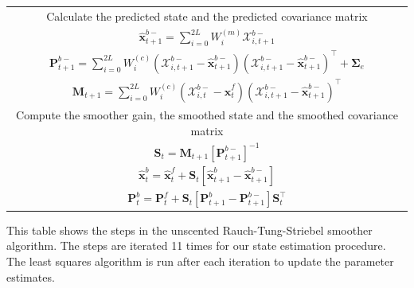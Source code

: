 \documentclass[12pt]{iopart}
\begin{document}
\begin{table}[!ht]
\begin{tabular}{|c|}
\multicolumn{1}{|p{16cm}|}{Calculate the predicted state and the predicted covariance matrix}\\
$\hat{\mathbf x}_{t+1}^{b-}=\sum_{i=0}^{2L} W_i^{(m)}\mathcal X_{i,t+1}^{b-}$\\
$\mathbf P_{t +1}^{b-}=\sum_{i=0}^{2L} W_i^{(c)}(\mathcal X_{i,t+1}^{b-}-\hat{\mathbf x}_{t +1}^{b-})(\mathcal X_{i,t+1}^{b-}-\hat{\mathbf x}_{t +1}^{b-})^\top+\boldsymbol \Sigma_e $\\
$\mathbf M_{t +1}=\sum_{i=0}^{2L} W_i^{(c)}(\mathcal X_{i,t}^{b-}-\hat{\mathbf x}_{t}^{f})(\mathcal X_{i,t+1}^{b-}-\hat{\mathbf x}_{t+1}^{b-})^\top$\\
\multicolumn{1}{|p{16cm}|}{Compute the smoother gain, the smoothed state and the smoothed covariance matrix}\\
$\mathbf S_t=\mathbf M_{t +1}\left[ \mathbf P_{t +1}^{b-}\right] ^{-1} $\\
$\hat{\mathbf x}_t^b=\hat{\mathbf x}_t^f+\mathbf S_t\left[\hat{\mathbf x}_{t+1}^{b}-\hat{\mathbf x}_{t+1}^{b-}\right]$\\
$\mathbf P_{t}^{b}=\mathbf P_{t}^{f}+\mathbf S_t\left[\mathbf P_{t+1}^{b}-\mathbf P_{t+1}^{b-} \right]\mathbf S_t^\top $\\
\hline
\end{tabular}
\begin{flushleft}This table shows the steps in the unscented Rauch-Tung-Striebel smoother algorithm. The steps are iterated 11 times for our state estimation procedure. The least squares algorithm is run after each iteration to update the parameter estimates.
\end{flushleft}
\label{tab:UKFAlgorithm}
\end{table}
\renewcommand{\arraystretch}{1}
\end{document}
